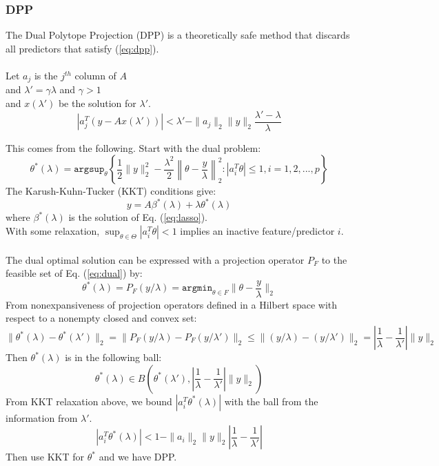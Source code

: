 \documentclass{article}
\begin{document}
\subsubsection*{DPP}

The Dual Polytope Projection (DPP) \cite{ddp} is a theoretically safe method that discards all predictors that satisfy (\ref{eq:dpp}).\\
\\
Let $a_j$ is the $j^{th}$ column of $A$ \\
and $\lambda' = \gamma \lambda$ and $\gamma > 1$ \\ 
and $x(\lambda')$ be the solution for $\lambda'$.\\

\begin{equation} \label{eq:dpp}
|a_j^T (y - Ax(\lambda'))| < \lambda' - \|a_j\|_2 \|y\|_2 \frac{\lambda'-\lambda}{\lambda}
\end{equation}

This comes from the following.
Start with the dual problem:
\begin{equation} \label{eq:dual}
\theta^*(\lambda)=\texttt{argsup}_\theta \left\{\frac 12 \|y\|_2^2 - \frac {\lambda^2}{2}\left\|\theta-\frac{y}{\lambda}\right\|_2^2 : |a^T_i \theta|\le 1, i = 1,2,...,p \right\}
\end{equation}
The Karush-Kuhn-Tucker (KKT) conditions give:
$$ y = A\beta^{*}(\lambda) + \lambda\theta^*(\lambda) $$
where $ \beta^{*}(\lambda) $ is the solution of Eq. (\ref{eq:lasso}).\\
With some relaxation, $\sup_{\theta\in\Theta}|a_i^T\theta|<1$ implies an inactive feature/predictor $i$.\\
\\
The dual optimal solution can be expressed with a projection operator $P_F$ to the feasible set of Eq. (\ref{eq:dual}) by:
$$ \theta^*(\lambda) = P_F(y/\lambda) = \texttt{argmin}_{\theta\in F}\|\theta - \frac y\lambda\|_2 $$
From nonexpansiveness of projection operators defined in a Hilbert space with respect to a nonempty closed and convex set:
$$ \|\theta^*(\lambda)-\theta^*(\lambda')\|_2 = \|P_F(y/\lambda)-P_F(y/\lambda')\|_2 \le \|(y/\lambda)-(y/\lambda')\|_2 = \left| \frac{1}{\lambda}-\frac{1}{\lambda'} \right| \|y\|_2 $$
Then $\theta^*(\lambda)$ is in the following ball:
$$ \theta^*(\lambda)\in B\left(\theta^*(\lambda'),\left| \frac{1}{\lambda}-\frac{1}{\lambda'} \right| \|y\|_2\right) $$
From KKT relaxation above, we bound $|a_i^T\theta^*(\lambda)|$ with the ball from the information from $\lambda'$.
$$ |a_i^T\theta^*(\lambda)| < 1 - \|a_i\|_2\|y\|_2\left|\frac{1}{\lambda}-\frac{1}{\lambda'}\right| $$
Then use KKT for $\theta^*$ and we have DPP.\\
~\\
\end{document}
